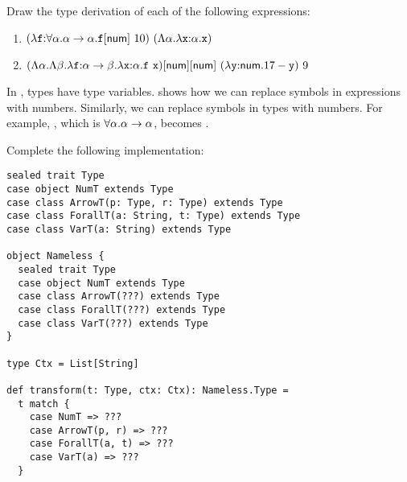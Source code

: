 \begin{exercise}

Draw the type derivation of each of the following expressions:

\begin{enumerate}
  \item
    $(\efunt{\cf}{\tforall{\alpha}{\tarrow{\alpha}{\alpha}}}{
      \etapp{\cf}{\tnum}\ 10})\ (\etfun{\alpha}{\efunt{\cx}{\alpha}{\cx}})$
  \item
    $
      \etapp{\etapp{(\etfun{\alpha}{\etfun{\beta}{
        \efunt{\cf}{\tarrow{\alpha}{\beta}}{
          \efunt{\cx}{\alpha}{\cf\ \cx}
        }
      }})}{\tnum}}{\tnum}\ (\efunt{\cy}{\tnum}{17-\cy})\ 9
    $
\end{enumerate}

\end{exercise}

\begin{exercise}

In \lang, types have type variables.
 shows how we can replace
symbols in expressions with numbers. Similarly, we can replace symbols in
types with numbers.  For example, , which is $\forall\alpha.\alpha\rightarrow\alpha$, becomes
.

Complete the following implementation:

\begin{verbatim}
sealed trait Type
case object NumT extends Type
case class ArrowT(p: Type, r: Type) extends Type
case class ForallT(a: String, t: Type) extends Type
case class VarT(a: String) extends Type

object Nameless {
  sealed trait Type
  case object NumT extends Type
  case class ArrowT(???) extends Type
  case class ForallT(???) extends Type
  case class VarT(???) extends Type
}

type Ctx = List[String]

def transform(t: Type, ctx: Ctx): Nameless.Type =
  t match {
    case NumT => ???
    case ArrowT(p, r) => ???
    case ForallT(a, t) => ???
    case VarT(a) => ???
  }
\end{verbatim}

\end{exercise}

